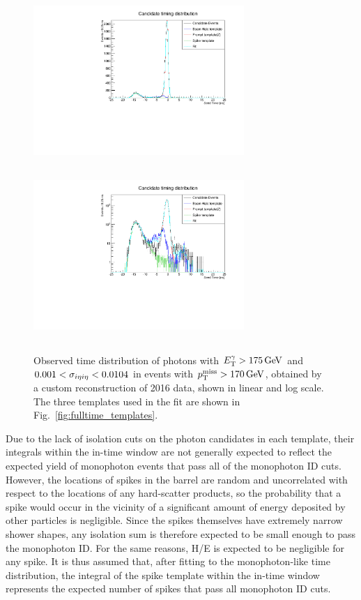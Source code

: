 \begin{figure}[tbp]
  \begin{center}
    \includegraphics[width=8.0cm,height=6.5cm]{Figures/noncol/StackFractionFitZ.pdf}
    \includegraphics[width=8.0cm,height=6.5cm]{Figures/noncol/StackFractionFitZLog.pdf}
    \caption{
      Observed time distribution of photons with $\ETgamma > 175\unit{GeV}$ and $0.001 < \sieie < 0.0104$ in events with $\MET > 170\unit{GeV}$,
       obtained by a custom reconstruction of 2016 data, shown in linear and log scale.
      The three templates used in the fit are shown in Fig.~\ref{fig:fulltime_templates}.
    }
    \label{fig:fulltime}
  \end{center}
\end{figure}

Due to the lack of isolation cuts on the photon candidates in each template, their integrals within the in-time window are not generally expected to reflect the
expected yield of monophoton events that pass all of the monophoton ID cuts. However, the locations of spikes in the barrel are random and uncorrelated
with respect to the locations of any hard-scatter products, so the probability that a spike would occur in the vicinity of a significant amount of energy deposited
by other particles is negligible. Since the spikes themselves have extremely narrow shower shapes, any isolation sum is therefore expected to be small enough to
pass the monophoton ID. For the same reasons, H/E is expected to be negligible for any spike.
It is thus assumed that, after fitting to the monophoton-like time distribution, the integral of the spike template within the in-time window
represents the expected number of spikes that pass all monophoton ID cuts.

